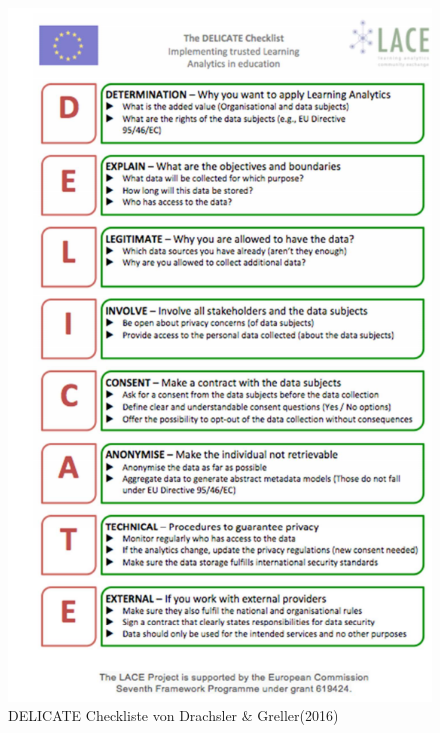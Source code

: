 \documentclass[a4paper, 12pt]{article}
\begin{document}
\begin{figure}[!h]
	\centering
	\includegraphics[scale = 0.8]{images/DELICATE.png}
	\caption{DELICATE Checkliste von Drachsler \& Greller(2016)}\label{fig:delicate}
\end{figure}
\end{document}
